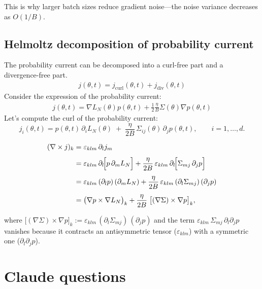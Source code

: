 \documentclass[11pt]{article}
\begin{document}
This is why larger batch sizes reduce gradient noise—the noise variance decreases as $O(1/B)$.

\subsection{Helmoltz decomposition of probability current}

The probability current can be decomposed into a curl-free part and a divergence-free part.
\begin{align}
j(\theta, t) = j_{\text{curl}}(\theta, t) + j_{\text{div}}(\theta, t)
\end{align}
Consider the expression of the probability current:
\begin{align}
j(\theta, t) = \nabla L_N(\theta) p(\theta, t) + \frac{1}{2} \frac{\eta}{B} \Sigma(\theta) \nabla p(\theta, t)
\end{align}
Let's compute the curl of the probability current:
\[
j_i(\theta,t)=p(\theta,t)\,\partial_i L_N(\theta)\;+\;
\frac{\eta}{2B}\,\Sigma_{ij}(\theta)\,\partial_j p(\theta,t),
\qquad i=1,\dots,d .
\]

\begin{align}
(\nabla\times j)_k
    &=\varepsilon_{klm}\,\partial_l j_m \\[4pt]
    &=\varepsilon_{klm}\,
      \partial_l\!\Bigl[p\,\partial_m L_N\Bigr]
      +\frac{\eta}{2B}\,
       \varepsilon_{klm}\,
       \partial_l\!\Bigl[\Sigma_{mj}\,\partial_j p\Bigr] \\[4pt]
    &=\varepsilon_{klm}\,(\partial_l p)\,(\partial_m L_N)
      +\frac{\eta}{2B}\,
       \varepsilon_{klm}\,
       (\partial_l\Sigma_{mj})\,(\partial_j p) \\[4pt]
    &=\bigl(\nabla p \times \nabla L_N\bigr)_k
      +\frac{\eta}{2B}\;
       \bigl[(\nabla\Sigma)\times\nabla p\bigr]_k ,
\end{align}

where  
\(
\displaystyle
\bigl[(\nabla\Sigma)\times\nabla p\bigr]_k
      :=\varepsilon_{klm}\,(\partial_l\Sigma_{mj})\,(\partial_j p)
\)
and the term
\(\varepsilon_{klm}\,\Sigma_{mj}\,\partial_l\partial_j p\)
vanishes because it contracts an antisymmetric tensor
(\(\varepsilon_{klm}\)) with a symmetric one
(\(\partial_l\partial_j p\)).


\section{Claude questions}
\end{document}

